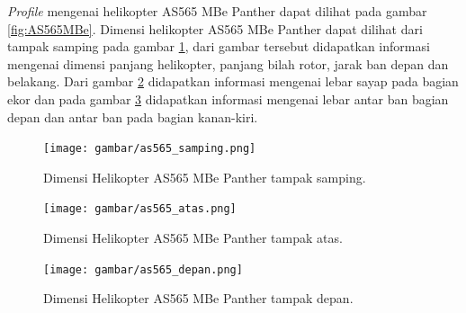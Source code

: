\textit{Profile} mengenai helikopter AS565 MBe Panther dapat dilihat pada gambar \ref{fig:AS565MBe}. Dimensi helikopter AS565 MBe Panther dapat dilihat dari tampak samping pada gambar \ref{fig:as565mbe_samping}, dari gambar tersebut didapatkan informasi mengenai dimensi panjang helikopter, panjang bilah rotor, jarak ban depan dan belakang. Dari gambar \ref{fig:as565mbe_atas} didapatkan informasi mengenai lebar sayap pada bagian ekor dan pada gambar \ref{fig:as565mbe_depan} didapatkan informasi mengenai lebar antar ban bagian depan dan antar ban pada bagian kanan-kiri.



\begin{figure}[H]
	\centering
	\texttt{[image: gambar/as565\_samping.png]}
	\caption{Dimensi Helikopter AS565 MBe Panther tampak samping.}
	\label{fig:as565mbe_samping}
\end{figure}

\begin{figure}[H]
	\centering
	\texttt{[image: gambar/as565\_atas.png]}
	\caption{Dimensi Helikopter AS565 MBe Panther tampak atas.}
	\label{fig:as565mbe_atas}
\end{figure}

\begin{figure}[H]
	\centering
	\texttt{[image: gambar/as565\_depan.png]}
	\caption{Dimensi Helikopter AS565 MBe Panther tampak depan.}
	\label{fig:as565mbe_depan}
\end{figure}